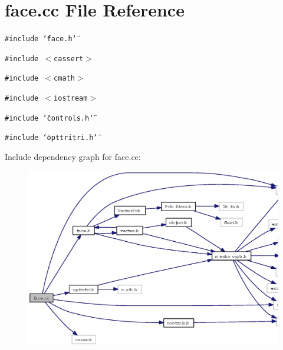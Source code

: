 \section{face.cc File Reference}
\label{face_8cc}
{\tt \#include \char`\"{}face.h\char`\"{}}\par
{\tt \#include $<$cassert$>$}\par
{\tt \#include $<$cmath$>$}\par
{\tt \#include $<$iostream$>$}\par
{\tt \#include \char`\"{}controls.h\char`\"{}}\par
{\tt \#include \char`\"{}opttritri.h\char`\"{}}\par


Include dependency graph for face.cc:\begin{figure}[H]
\begin{center}
\leavevmode
\includegraphics[width=331pt]{face_8cc__incl}
\end{center}
\end{figure}
